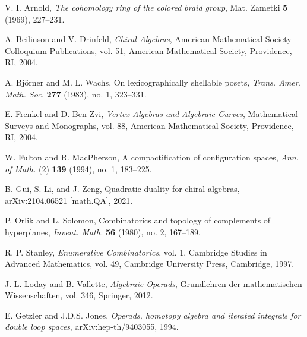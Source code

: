 \begin{thebibliography}{99}

V. I. Arnold, \emph{The cohomology ring of the colored braid group}, 
Mat. Zametki \textbf{5} (1969), 227--231.

 A. Beilinson and V. Drinfeld, \emph{Chiral Algebras}, American Mathematical Society Colloquium Publications, vol. 51, American Mathematical Society, Providence, RI, 2004.
 
 A. Björner and M. L. Wachs, On lexicographically shellable posets, \emph{Trans. Amer. Math. Soc.} \textbf{277} (1983), no. 1, 323--331.
 
 E. Frenkel and D. Ben-Zvi, \emph{Vertex Algebras and Algebraic Curves}, Mathematical Surveys and Monographs, vol. 88, American Mathematical Society, Providence, RI, 2004.
 
 W. Fulton and R. MacPherson, A compactification of configuration spaces, \emph{Ann. of Math.} (2) \textbf{139} (1994), no. 1, 183--225.
 
 B. Gui, S. Li, and J. Zeng, Quadratic duality for chiral algebras, arXiv:2104.06521 [math.QA], 2021.
 
 P. Orlik and L. Solomon, Combinatorics and topology of complements of hyperplanes, \emph{Invent. Math.} \textbf{56} (1980), no. 2, 167--189.
 
 R. P. Stanley, \emph{Enumerative Combinatorics}, vol. 1, Cambridge Studies in Advanced Mathematics, vol. 49, Cambridge University Press, Cambridge, 1997.

 J.-L. Loday and B. Vallette, \emph{Algebraic Operads}, Grundlehren der mathematischen Wissenschaften, vol. 346, Springer, 2012.

 E. Getzler and J.D.S. Jones, \emph{Operads, homotopy algebra and iterated integrals for double loop spaces}, arXiv:hep-th/9403055, 1994.
 
\end{thebibliography}
